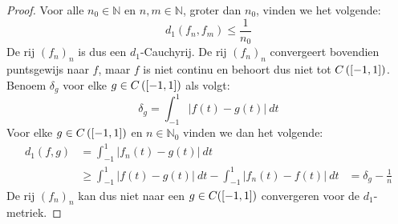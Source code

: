 \documentclass[main.tex]{subfiles}
\begin{document}
\begin{bpr}
\begin{proof}
    Voor alle $n_{0}\in \mathbb{N}$ en $n,m\in \mathbb{N}$, groter dan $n_{0}$, vinden we het volgende:
    \[ d_{1}(f_{n},f_{m}) \le \frac{1}{n_{0}} \]
    De rij $(f_{n})_{n}$ is dus een $d_{1}$-Cauchyrij.
    De rij $(f_{n})_{n}$ convergeert bovendien puntsgewijs naar $f$, maar $f$ is niet continu en behoort dus niet tot $C\left(\interval{-1}{1}\right)$.
    Benoem $\delta_{g}$ voor elke $g\in C\left(\interval{-1}{1}\right)$ als volgt:
    \[ \delta_{g} = \int_{-1}^{1}|f(t)-g(t)|\ dt \]
    Voor elke $g\in C\left(\interval{-1}{1}\right)$ en $n\in\mathbb{N}_{0}$ vinden we dan het volgende:
    \begin{align*}
      d_{1}(f,g)
      &= \int_{-1}^{1}|f_{n}(t)-g(t)|\ dt\\
      &\ge \int_{-1}^{1}|f(t)-g(t)|\ dt-\int_{-1}^{1}|f_{n}(t)-f(t)|\ dt
      &= \delta_{g}-\frac{1}{n}
    \end{align*}
    De rij $(f_{n})_{n}$ kan dus niet naar een $g\in C(\interval{-1}{1})$ convergeren voor de $d_{1}$-metriek.
  \end{proof}
\end{bpr}
\end{document}
